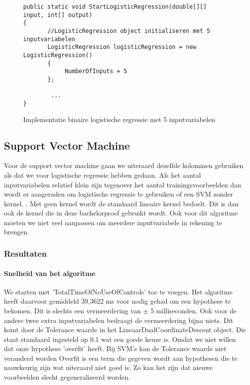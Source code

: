 \begin{figure}[]
	\renewcommand{\figurename}{Code}
\begin{lstlisting}
public static void StartLogisticRegression(double[][] input, int[] output)
{
       //LogisticRegression object initialiseren met 5 inputvariabelen
       LogisticRegression logisticRegression = new LogisticRegression()
       {
       		NumberOfInputs = 5
       };
		
		...
}

\end{lstlisting}
\caption{Implementatie binaire logistische regressie met 5 inputvariabelen}
\label{code:linaireRegressieTweeKlassenM5}
\end{figure}


\newpage
\subsection{Support Vector Machine}
\label{sec:supportvectormachineFase2}
Voor de support vector machine gaan we uiteraard dezelfde kolommen gebruiken als dat we voor logistische regressie hebben gedaan. Als het aantal inputvariabelen relatief klein zijn tegenover het aantal trainingsvoorbeelden dan wordt er aangeraden om logistische regressie te gebruiken of een SVM zonder kernel. \autocite{courseraSVM}. Met geen kernel wordt de standaard lineaire kernel bedoelt. Dit is dan ook de kernel die in deze bachelorproef gebruikt wordt.
Ook voor dit algoritme moeten we niet veel aanpassen om meerdere inputvariabele in rekening te brengen. 

\subsubsection{Resultaten}
\paragraph{Snelheid van het algoritme} 
We starten met 'TotalTimeOfNoUseOfControls' toe te voegen. Het algoritme heeft daarvoor gemiddeld 39,3622 ms voor nodig gehad om een hypothese te bekomen. Dit is slechts een vermeerdering van $\pm$ 5 milliseconden. Ook voor de andere twee extra inputvariabelen bedraagt de vermeerdering bijna niets. Dit komt door de Tolerance waarde in het LineaarDualCoordinateDescent object. Die staat standaard ingesteld op 0.1 wat een goede keuze is. Omdat we niet willen dat onze hypothese 'overfit' heeft. Bij SVM's kan de Tolerance waarde niet veranderd worden Overfit is een term die gegeven wordt aan hypothesen die te nauwkeurig zijn wat uiteraard niet goed is. Zo kan het zijn dat nieuwe voorbeelden slecht gegeneraliseerd worden. 


